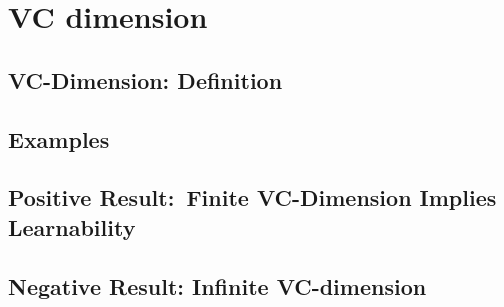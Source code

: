 \documentclass[12pt,a4paper,oneside]{book}
\begin{document}
\chapter{VC dimension}

\label{c_7}

\section{VC-Dimension: Definition}

\label{s_7_1}

\section{Examples}

\label{s_7_2}

\section{Positive Result:\ Finite VC-Dimension Implies Learnability}

\label{s_7_3}

\section{Negative Result: Infinite VC-dimension}

\label{s_7_4}
\end{document}
